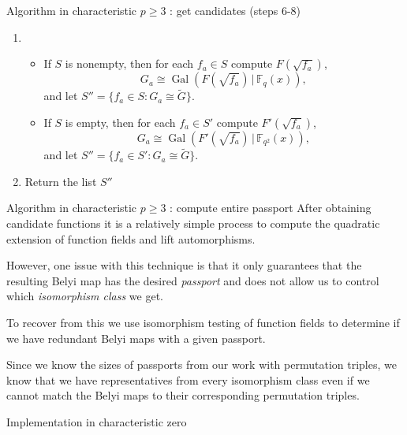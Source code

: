 \documentclass[xcolor=dvipsnames,handout]{beamer}
\theoremstyle{plain}
\newcommand{\wt}[1]{\widetilde{#1}}
\newcommand{\FF}{\mathbb{F}}
\DeclareMathOperator{\Gal}{Gal}
\begin{document}
{\begin{frame}{Algorithm in characteristic $p\geq 3$ : get candidates (steps 6-8)}
\begin{enumerate}
          saved in Step 5e.
          \pause
        \item[7.]
          \begin{itemize}
            \item
              If $S$ is nonempty,
              then
              for each $f_a\in S$
              compute
              $F(\sqrt{f_a})$,
              \[
                G_a\cong\Gal(F(\sqrt{f_a})\,|\,\FF_q(x)),
              \]
              and let
              $S''=
              \{f_a\in S:G_a\cong\wt{G}\}$.
              \pause
            \item
              If $S$ is empty,
              then
              for each $f_a\in S'$
              compute
              $F'(\sqrt{f_a})$,
              \[
                G_a\cong\Gal(F'(\sqrt{f_a})\,|\,\FF_{q^2}(x)),
              \]
              and let
              $S''=
              \{f_a\in S':G_a\cong\wt{G}\}$.
              \pause
          \end{itemize}
        \item[8.]
          Return the list $S''$
      \end{enumerate}
    \end{frame}
    \begin{frame}{Algorithm in characteristic $p\geq 3$ : compute entire passport}
      After obtaining candidate functions it is a relatively
      simple process to compute the quadratic extension
      of function fields and lift automorphisms.
      \pause\par
      However, one issue with this technique
      is that it only guarantees that the
      resulting Belyi map has the desired
      \emph{passport} and does not allow us
      to control which \emph{isomorphism class} we get.
      \pause\par
      To recover from this we use isomorphism testing
      of function fields to determine if we have
      redundant Belyi maps with a given passport.
      \pause\par
      Since we know the sizes of passports from our
      work with permutation triples,
      we know that we have representatives from
      every isomorphism class
      even if we cannot match the Belyi maps
      to their corresponding permutation triples.
    \end{frame}
    \begin{frame}{Implementation in characteristic zero}

\end{frame}}
\end{document}
